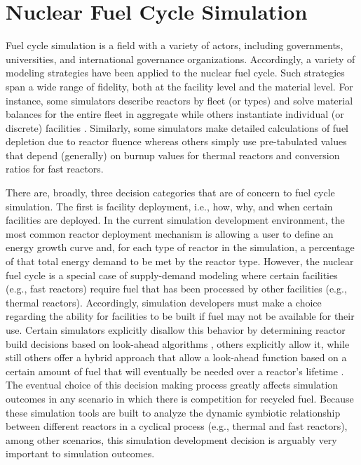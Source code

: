 
\section{Nuclear Fuel Cycle Simulation}\label{intro:fcs}
 
Fuel cycle simulation is a field with a variety of actors, including
governments, universities, and international governance
organizations. Accordingly, a variety of modeling strategies have been applied
to the nuclear fuel cycle. Such strategies span a wide range of fidelity, both
at the facility level and the material level. For instance, some simulators
describe reactors by fleet (or types) and solve material balances for the entire
fleet in aggregate \cite{busquim_e_silva_system_2008,yacout_vision_2006} while
others instantiate individual (or discrete) facilities
\cite{schneider_nfcsim:_2005}. Similarly, some simulators make detailed
calculations of fuel depletion due to reactor fluence \cite{boucher_cosi:_2006}
whereas others simply use pre-tabulated values that depend (generally) on burnup
values for thermal reactors and conversion ratios for fast reactors.

There are, broadly, three decision categories that are of concern to fuel cycle
simulation. The first is facility deployment, i.e., how, why, and when certain
facilities are deployed. In the current simulation development environment, the
most common reactor deployment mechanism is allowing a user to define an energy
growth curve and, for each type of reactor in the simulation, a percentage of
that total energy demand to be met by the reactor type. However, the nuclear
fuel cycle is a special case of supply-demand modeling where certain facilities
(e.g., fast reactors) require fuel that has been processed by other facilities
(e.g., thermal reactors). Accordingly, simulation developers must make a choice
regarding the ability for facilities to be built if fuel may not be available
for their use. Certain simulators explicitly disallow this behavior by
determining reactor build decisions based on look-ahead algorithms
\cite{schweitzer_improved_2008}, others explicitly allow it, while still others
offer a hybrid approach that allow a look-ahead function based on a certain
amount of fuel that will eventually be needed over a reactor's lifetime
\cite{van_den_durpel_daness_2009}. The eventual choice of this decision making
process greatly affects simulation outcomes in any scenario in which there is
competition for recycled fuel. Because these simulation tools are built to
analyze the dynamic symbiotic relationship between different reactors in a
cyclical process (e.g., thermal and fast reactors), among other scenarios, this
simulation development decision is arguably very important to simulation
outcomes.

